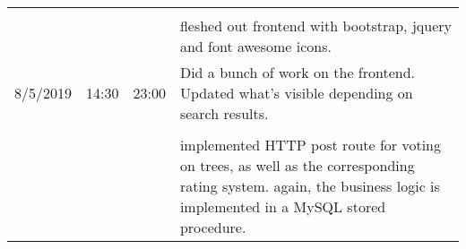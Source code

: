 \documentclass{article}
\begin{document}
\begin{table}[h!]
\begin{tabular}{l|r|r|p{15cm}}
        &   &   &   \\
        &   &                               &   fleshed out frontend with bootstrap, jquery and font awesome icons.\\
        \hline
        8/5/2019    &   14:30   &   23:00   &   Did a bunch of work on the frontend. Updated what's visible depending on search results.\\
        &   &   &   \\
        &   &                               &   implemented HTTP post route for voting on trees, as well as the corresponding rating system. again, the business logic is implemented in a MySQL stored procedure.\\
    \end{tabular}
\end{table}
\end{document}
